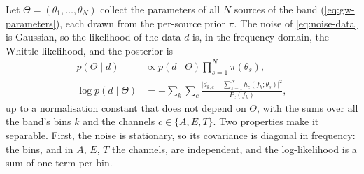 Let $\Theta = (\theta_1,\dots,\theta_N)$ collect the parameters of all $N$ sources of the band
(\cref{eq:gw-parameters}), each drawn from the per-source prior $\pi$. The noise of
\cref{eq:noise-data} is Gaussian, so the likelihood of the data $d$ is, in the frequency domain, the
Whittle likelihood, and the posterior is
\begin{equation}
\begin{aligned}
  p(\Theta\mid d) &\propto p(d\mid\Theta)\prod_{s=1}^{N}\pi(\theta_s),\\
  \log p(d\mid\Theta) &= -\sum_{k}\sum_{c}\frac{\bigl|\tilde d_{k,c}-\sum\limits_{s=1}^{N}\tilde h_c(f_k;\theta_s)\bigr|^2}{P_c(f_k)},
\end{aligned}
  \label{eq:gw-band-posterior}
\end{equation}
up to a normalisation constant that does not depend on $\Theta$, with the sums over all the band's bins $k$ and the channels $c\in\{A,E,T\}$. Two properties make it separable. First, the noise is stationary, so its covariance is
diagonal in frequency: the bins, and in $A$, $E$, $T$ the channels, are independent, and the
log-likelihood is a sum of one term per bin.

